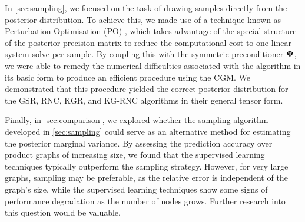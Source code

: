 In \cref{sec:sampling}, we focused on the task of drawing samples directly from the posterior distribution. To achieve this, we made use of a technique known as Perturbation Optimisation (PO) \citep{Orieux2012}, which takes advantage of the special structure of the posterior precision matrix  to reduce the computational cost to one linear system solve per sample. By coupling this with the symmetric preconditioner $\mathbf{\Psi}$, we were able to remedy the numerical difficulties associated with the algorithm in its basic form to produce an efficient procedure using the CGM. We demonstrated that this procedure yielded the correct posterior distribution for the GSR, RNC, KGR, and KG-RNC algorithms in their general tensor form.  

Finally, in \cref{sec:comparison}, we explored whether the sampling algorithm developed in \cref{sec:sampling} could serve as an alternative method for estimating the posterior marginal variance. By assessing the prediction accuracy over product graphs of increasing size, we found that the supervised learning techniques typically outperform the sampling strategy. However, for very large graphs, sampling may be preferable, as the relative error is independent of the graph's size, while the supervised learning techniques show some signs of performance degradation as the number of nodes grows. Further research into this question would be valuable.